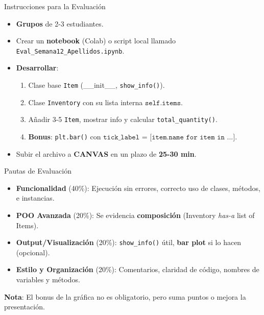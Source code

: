 \documentclass[10pt]{beamer}
\begin{document}
\begin{frame}{Instrucciones para la Evaluación}
  \begin{itemize}
    \item \textbf{Grupos} de 2-3 estudiantes.
    \item Crear un \textbf{notebook} (Colab) o script local llamado \texttt{Eval\_Semana12\_Apellidos.ipynb}.
    \item \textbf{Desarrollar}:
      \begin{enumerate}
        \item Clase base \texttt{Item} (\_\_init\_\_, \texttt{show\_info()}).
        \item Clase \texttt{Inventory} con su lista interna \(\texttt{self.items}\).
        \item Añadir 3-5 \texttt{Item}, mostrar info y calcular \texttt{total\_quantity()}.
        \item \textbf{Bonus}: \texttt{plt.bar()} con \(\texttt{tick\_label = [item.name for item in ...]}\).
      \end{enumerate}
    \item Subir el archivo a \textbf{CANVAS} en un plazo de \textbf{25-30 min}.
  \end{itemize}
\end{frame}

\begin{frame}{Pautas de Evaluación}
  \begin{itemize}
    \item \textbf{Funcionalidad} (40\%): Ejecución sin errores, correcto uso de clases, métodos, e instancias.
    \item \textbf{POO Avanzada} (20\%): Se evidencia \textbf{composición} (Inventory \emph{has-a} list of Items).  
    \item \textbf{Output/Visualización} (20\%): \texttt{show\_info()} útil, \textbf{bar plot} si lo hacen (opcional).
    \item \textbf{Estilo y Organización} (20\%): Comentarios, claridad de código, nombres de variables y métodos.
  \end{itemize}
  \vspace{0.3cm}
  \textbf{Nota}: El bonus de la gráfica no es obligatorio, pero suma puntos o mejora la presentación.
\end{frame}
\end{document}
